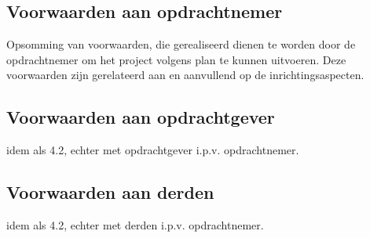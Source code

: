 
\subsection{Voorwaarden aan opdrachtnemer}
Opsomming van voorwaarden, die gerealiseerd dienen te worden door de opdrachtnemer om het project volgens plan te kunnen uitvoeren.
Deze voorwaarden zijn gerelateerd aan en aanvullend op de inrichtingsaspecten.

\subsection{Voorwaarden aan opdrachtgever}

idem als 4.2, echter met opdrachtgever i.p.v. opdrachtnemer.

\subsection{Voorwaarden aan derden}

idem als 4.2, echter met derden i.p.v. opdrachtnemer.

